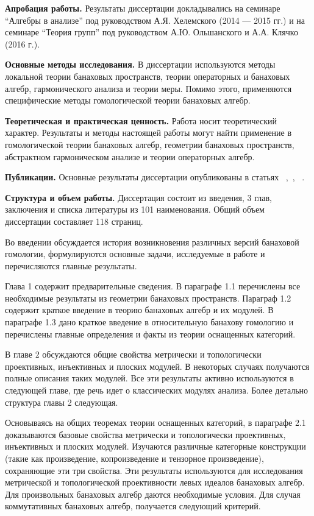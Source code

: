 \textbf{Апробация работы.} Результаты диссертации докладывались  на семинаре
``Алгебры в анализе'' под руководством А.Я. Хелемского  (2014 — 2015 гг.) и на
семинаре ``Теория групп'' под руководством А.Ю. Ольшанского и А.А. Клячко (2016
г.).

\textbf{Основные методы исследования.} В диссертации используются методы
локальной теории банаховых пространств, теории операторных и банаховых алгебр,
гармонического анализа и теории меры. Помимо этого, применяются специфические
методы гомологической теории банаховых алгебр.

\textbf{Теоретическая и практическая ценность.} Работа носит теоретический
характер. Результаты и методы настоящей работы могут найти применение в
гомологической теории банаховых алгебр, геометрии банаховых пространств,
абстрактном гармоническом анализе и теории операторных алгебр.

\textbf{Публикации.} Основные результаты диссертации опубликованы в статьях
~\cite{NemMetTopProjIdBanAlg},~\cite{NemTopInjCStarAlg},
~\cite{NemHomolTrivCatModLp}.

\textbf{Структура и объем работы.} Диссертация состоит из введения, 3 глав,
заключения и списка литературы из 101 наименования. Общий объем диссертации
составляет 118 страниц.

Во введении обсуждается история возникновения различных версий банаховой
гомологии, формулируются основные задачи, исследуемые в работе и перечисляются
главные результаты.

Глава 1 содержит предварительные сведения. В параграфе 1.1 перечислены все
необходимые результаты из геометрии банаховых пространств. Параграф 1.2 содержит
краткое введение в теорию банаховых алгебр и их модулей. В параграфе 1.3 дано
краткое введение в относительную банахову гомологию и перечислены главные
определения и факты из теории оснащенных категорий.

В главе 2 обсуждаются общие свойства метрически и топологически проективных,
инъективных и плоских модулей. В некоторых случаях получаются полные описания
таких модулей. Все эти результаты активно используются в следующей главе, где
речь идет о классических модулях анализа. Более детально структура главы 2
следующая. 

Основываясь на общих теоремах теории оснащенных категорий, в параграфе 2.1
доказываются базовые свойства метрически и топологически проективных,
инъективных и плоских модулей. Изучаются различные категорные конструкции (такие
как произведение, копроизведение и тензорное произведение), сохраняющие эти три
свойства. Эти результаты используются для исследования метрической и
топологической проективности левых идеалов банаховых алгебр. Для произвольных
банаховых алгебр даются необходимые условия. Для случая коммутативных банаховых
алгебр, получается следующий критерий.

